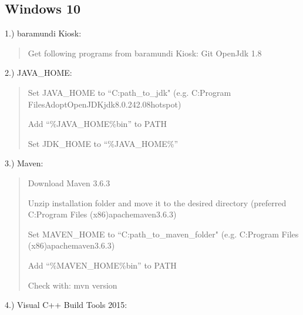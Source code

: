 \documentclass[letterpaper,10pt,english]{sphinxmanual}
\begin{document}
\subsection{Windows 10}
\label{\detokenize{windows10_install:windows-10}}\label{\detokenize{windows10_install:windows10install}}\label{\detokenize{windows10_install::doc}}
1.) baramundi Kiosk: 
\begin{quote}

Get following programs from baramundi Kiosk:
\sphinxhyphen{} Git
\sphinxhyphen{} OpenJdk 1.8
\end{quote}

2.) JAVA\_HOME:
\begin{quote}

Set JAVA\_HOME to “C:path\_to\_jdk" (e.g. C:Program FilesAdoptOpenJDKjdk\sphinxhyphen{}8.0.242.08\sphinxhyphen{}hotspot)

Add “\%JAVA\_HOME\%bin” to PATH

Set JDK\_HOME to “\%JAVA\_HOME\%”
\end{quote}

3.) Maven: 
\begin{quote}

Download Maven 3.6.3

Unzip installation folder and move it to the desired directory (preferred C:Program Files (x86)apache\sphinxhyphen{}maven\sphinxhyphen{}3.6.3)

Set MAVEN\_HOME to “C:path\_to\_maven\_folder" (e.g. C:Program Files (x86)apache\sphinxhyphen{}maven\sphinxhyphen{}3.6.3)

Add “\%MAVEN\_HOME\%bin” to PATH

Check with: mvn \textendash{}version
\end{quote}

4.) Visual C++ Build Tools 2015: 
\end{document}
